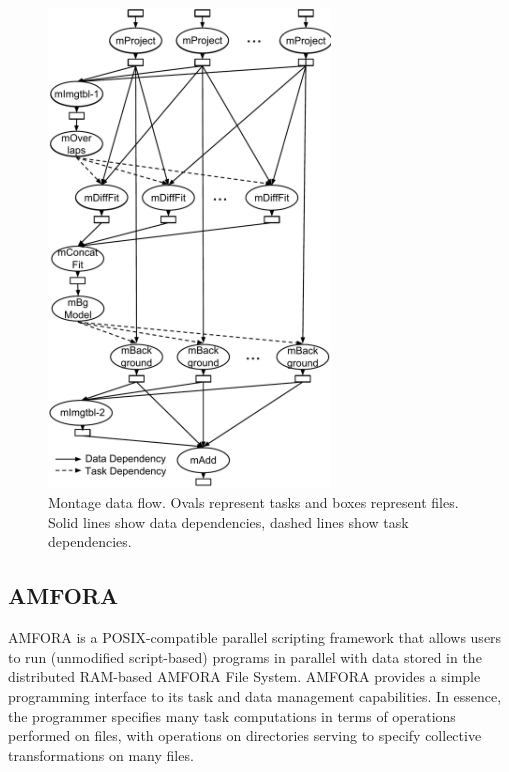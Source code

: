 \documentclass{sig-alternate}
\begin{document}
\begin{figure}[h]
\begin{center}
    \includegraphics[width=75mm]{pictures/montage}
\caption {Montage data flow. Ovals represent tasks and boxes represent files. Solid lines show data dependencies, dashed lines show task dependencies.
    \label{fig:montage-flow}
}
\end{center}
\end{figure}



\subsection{AMFORA}

AMFORA is a POSIX-compatible parallel scripting framework that allows users to run (unmodified script-based) 
programs in parallel with data stored in the distributed RAM-based AMFORA File System.  
AMFORA provides a simple programming interface to its task and data management capabilities.
In essence, the programmer specifies many task computations in terms of operations performed on files,
with operations on directories serving to specify collective transformations on many files.
\end{document}
